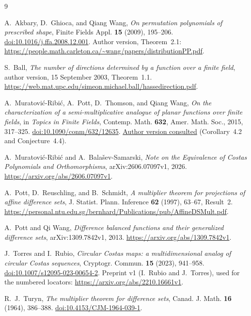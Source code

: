 \documentclass[11pt]{article}
\theoremstyle{definition}
\theoremstyle{remark}
\numberwithin{equation}{section}
\begin{document}
\begin{thebibliography}{9}

A.~Akbary, D.~Ghioca, and Qiang Wang,
\emph{On permutation polynomials of prescribed shape},
Finite Fields Appl. \textbf{15} (2009), 195--206.
\href{https://doi.org/10.1016/j.ffa.2008.12.001}{doi:10.1016/j.ffa.2008.12.001}.
Author version, Theorem~2.1:
\url{https://people.math.carleton.ca/~wang/papers/distributionPP.pdf}.

S.~Ball,
\emph{The number of directions determined by a function over a finite field},
author version, 15 September 2003, Theorem~1.1.
\url{https://web.mat.upc.edu/simeon.michael.ball/hassedirection.pdf}.

A.~Muratovi\'c-Ribi\'c, A.~Pott, D.~Thomson, and Qiang Wang,
\emph{On the characterization of a semi-multiplicative analogue of planar
functions over finite fields},
in \emph{Topics in Finite Fields}, Contemp. Math. \textbf{632},
Amer. Math. Soc., 2015, 317--325.
\href{https://doi.org/10.1090/conm/632/12635}{doi:10.1090/conm/632/12635}.
\href{https://www.academia.edu/79639197/On_the_characterization_of_a_semi_multiplicative_analogue_of_planar_functions_over_finite_fields}{Author version consulted}
(Corollary~4.2 and Conjecture~4.4).

A.~Muratovi\'c-Ribi\'c and A.~Bala\v sev-Samarski,
\emph{Note on the Equivalence of Costas Polynomials and Orthomorphisms},
arXiv:2606.07097v1, 2026.
\url{https://arxiv.org/abs/2606.07097v1}.

A.~Pott, D.~Reuschling, and B.~Schmidt,
\emph{A multiplier theorem for projections of affine difference sets},
J. Statist. Plann. Inference \textbf{62} (1997), 63--67, Result~2.
\url{https://personal.ntu.edu.sg/bernhard/Publications/pub/AffineDSMult.pdf}.

A.~Pott and Qi Wang,
\emph{Difference balanced functions and their generalized difference sets},
arXiv:1309.7842v1, 2013.
\url{https://arxiv.org/abs/1309.7842v1}.

J.~Torres and I.~Rubio,
\emph{Circular Costas maps: a multidimensional analog of circular Costas sequences},
Cryptogr. Commun. \textbf{15} (2023), 941--958.
\href{https://doi.org/10.1007/s12095-023-00654-2}{doi:10.1007/s12095-023-00654-2}.
Preprint v1 (I.~Rubio and J.~Torres), used for the numbered locators:
\url{https://arxiv.org/abs/2210.16661v1}.

R.~J.~Turyn,
\emph{The multiplier theorem for difference sets},
Canad. J. Math. \textbf{16} (1964), 386--388.
\href{https://doi.org/10.4153/CJM-1964-039-1}{doi:10.4153/CJM-1964-039-1}.

\end{thebibliography}
\end{document}
